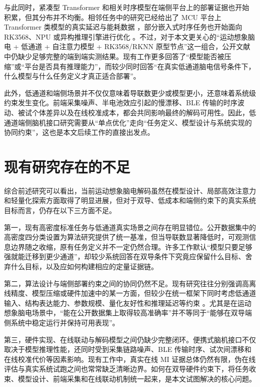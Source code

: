 \noindent
与此同时，紧凑型 Transformer 和相关时序模型在端侧平台上的部署证据也开始积累，但其分布并不均衡。相邻任务中的研究已经给出了 MCU 平台上 Transformer 类模型的真实延迟与能耗数据 \cite{bus2024reducing}，部分嵌入式时序任务也开始面向 RK3568、NPU 或异构推理引擎进行优化 \cite{You24, Ism23}。不过，对于本文更关心的“运动想象脑电 + 低通道 + 自注意力模型 + RK3568/RKNN 原型节点”这一组合，公开文献中仍缺少足够完整的端到端实测结果。现有工作更多回答了“模型能否被压缩”或“平台是否具有推理能力”，而较少同时回答“在真实低通道脑电信号条件下，什么模型与什么任务定义才真正适合部署”。

\noindent
此外，低通道和端侧场景并不仅仅意味着导联数更少或模型更小，还意味着系统级约束发生变化。前端采集噪声、半电池效应引起的慢漂移、BLE 传输的时序波动、被试个体差异以及在线校准成本，都会共同影响最终的解码可用性。因此，低通道端侧脑机接口研究需要从“单点优化”走向“任务定义、模型设计与系统实现的协同约束”，这也是本文后续工作的直接出发点。

\section{现有研究存在的不足}

综合前述研究可以看出，当前运动想象脑电解码虽然在模型设计、局部高效注意力和轻量化探索方面取得了明显进展，但对于双导、低成本和端侧约束下的真实系统目标而言，仍存在以下三方面不足。

\noindent
第一，现有高密度标准任务与低通道真实场景之间存在明显错位。公开数据集中的高密度四分类设置为算法研究提供了统一基准，但当导联数显著降低时，可观测信息边界随之收缩，原有任务定义并不一定仍然合理。许多工作默认“模型只要足够强就能迁移到更少通道”，却较少系统回答在双导条件下究竟应保留什么目标、舍弃什么目标，以及应如何构建相应的定量证据链。

\noindent
第二，算法设计与端侧部署约束之间的协同仍然不足。现有研究往往分别强调高离线精度、模型压缩或硬件加速中的某一方面，但较少在统一框架下同时考虑低通道输入、结构表达能力、参数规模、量化友好性和推理延迟等约束 \cite{keu2024compact, wan2023novel, hua2023improved}。尤其是在运动想象脑电场景中，“能在公开数据集上取得较高准确率”并不等同于“能够在双导端侧系统中稳定运行并保持可用表现”。

\noindent
第三，硬件实现、在线联动与解码模型之间仍缺少完整闭环。便携式脑机接口不仅取决于模型推理性能，还同时受到采集链路噪声、BLE 传输时序、试次间漂移和在线校准代价等因素影响。现有工作中，真实在线 MI 证据总体仍然有限，伪在线评估与真实系统试跑之间也常常缺乏清晰边界。如何在双导硬件约束下，将任务收束、模型设计、前端采集和在线联动机制统一起来，是本文试图解决的核心问题。

